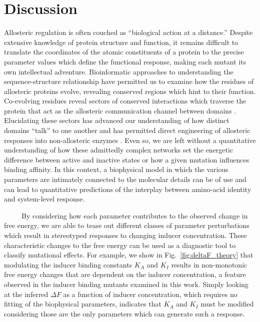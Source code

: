 \documentclass[12pt]{caltech_thesis}
\begin{document}
\hypertarget{discussion-1}{%
\section{Discussion}\label{discussion-1}}

Allosteric regulation is often couched as ``biological action at a
distance.'' Despite extensive knowledge of protein structure and
function, it remains difficult to translate the coordinates of the
atomic constituents of a protein to the precise parameter values which
define the functional response, making each mutant its own intellectual
adventure. Bioinformatic approaches to understanding the
sequence-structure relationship have permitted us to examine how the
residues of allosteric proteins evolve, revealing conserved regions
which hint to their function. Co-evolving residues reveal sectors of
conserved interactions which traverse the protein that act as the
allosteric communication channel between domains
\autocite{suel2003,mclaughlinjr2012,reynolds2011}. Elucidating these
sectors has advanced our understanding of how distinct domains ``talk''
to one another and has permitted direct engineering of allosteric
responses into non-allosteric enzymes
\autocite{poelwijk2011a,raman2016}. Even so, we are left without a
quantitative understanding of how these admittedly complex networks set
the energetic difference between active and inactive states or how a
given mutation influences binding affinity. In this context, a
biophysical model in which the various parameters are intimately
connected to the molecular details can be of use and can lead to
quantitative predictions of the interplay between amino-acid identity
and system-level response.

~~~~~By considering how each parameter contributes to the observed
change in free energy, we are able to tease out different classes of
parameter perturbations which result in stereotyped responses to
changing inducer concentration. These characteristic changes to the free
energy can be used as a diagnostic tool to classify mutational effects.
For example, we show in Fig.~\ref{fig:deltaF_theory} that modulating the
inducer binding constants \(K_A\) and \(K_I\) results in non-monotonic
free energy changes that are dependent on the inducer concentration, a
feature observed in the inducer binding mutants examined in this work.
Simply looking at the inferred \(\Delta F\) as a function of inducer
concentration, which requires no fitting of the biophysical parameters,
indicates that \(K_A\) and \(K_I\) must be modified considering those
are the only parameters which can generate such a response.
\end{document}
